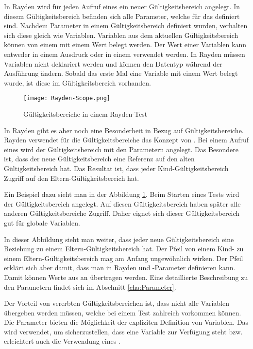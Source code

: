 In Rayden wird für jeden Aufruf eines  ein neuer Gültigkeitsbereich angelegt. In diesem Gültigkeitsbereich befinden sich alle Parameter, welche für das  definiert sind. Nachdem Parameter in einem Gültigkeitsbereich definiert wurden, verhalten sich diese gleich wie Variablen. Variablen aus dem aktuellen Gültigkeitsbereich können von einem  mit einem Wert belegt werden. Der Wert einer Variablen kann entweder in einem Ausdruck oder in einem  verwendet werden. In Rayden müssen Variablen nicht deklariert werden und können den Datentyp während der Ausführung ändern. Sobald das erste Mal eine Variable mit einem Wert belegt wurde, ist diese im Gültigkeitsbereich vorhanden.

\begin{figure}[h]
\centering
\texttt{[image: Rayden-Scope.png]}
\caption{Gültigkeitsbereiche in einem Rayden-Test}
\label{fig:rayden-scope}
\end{figure}

\SuperPar
In Rayden gibt es aber noch eine Besonderheit in Bezug auf Gültigkeitsbereiche. Rayden verwendet für die Gültigkeitsbereiche das Konzept von . Bei einem Aufruf eines  wird der Gültigkeitsbereich mit den Parametern angelegt. Das Besondere ist, dass der neue Gültigkeitsbereich eine Referenz auf den alten Gültigkeitsbereich hat. Das Resultat ist, dass jeder Kind-Gültigkeitsbereich Zugriff auf den Eltern-Gültigkeitsbereich hat.

\SuperPar
Ein Beispiel dazu sieht man in der Abbildung \ref{fig:rayden-scope}. Beim Starten eines Tests wird der Gültigkeitsbereich  angelegt. Auf diesen Gültigkeitsbereich haben später alle anderen Gültigkeitsbereiche Zugriff. Daher eignet sich dieser Gültigkeitsbereich gut für globale Variablen.

\SuperPar
In dieser Abbildung sieht man weiter, dass jeder neue Gültigkeitsbereich eine Beziehung zu einem Eltern-Gültigkeitsbereich hat. Der Pfeil von einem Kind- zu einem Eltern-Gültigkeitsbereich mag am Anfang ungewöhnlich wirken. Der Pfeil erklärt sich aber damit, dass man in Rayden  und -Parameter definieren kann. Damit können Werte aus  an  übertragen werden. Eine detaillierte Beschreibung zu den Parametern findet sich im Abschnitt \ref{cha:Parameter}.

\SuperPar
Der Vorteil von vererbten Gültigkeitsbereichen ist, dass nicht alle Variablen übergeben werden müssen, welche bei einem Test zahlreich vorkommen können. Die Parameter bieten die Möglichkeit der expliziten Definition von Variablen. Das wird verwendet, um sicherzustellen, dass eine Variable zur Verfügung steht bzw. erleichtert auch die Verwendung eines .

